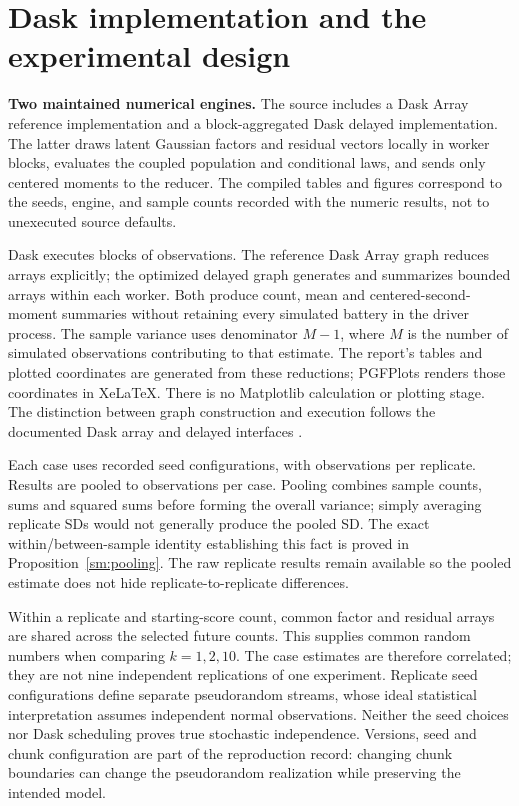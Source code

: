 \chapter{Dask implementation and the experimental design}
\label{sec:seq-sim-design}


\noindent\textbf{Two maintained numerical engines.}
The source includes a Dask Array reference implementation and a
block-aggregated Dask delayed implementation. The latter draws latent
Gaussian factors and residual vectors locally in worker blocks,
evaluates the coupled population and conditional laws, and sends only
centered moments to the reducer. The compiled tables and figures
correspond to the seeds, engine, and sample counts recorded with the
numeric results, not to unexecuted source defaults.

Dask executes blocks of \SimChunk{} observations. The reference
Dask Array graph reduces arrays explicitly; the optimized delayed
graph generates and summarizes bounded arrays within each worker.
Both produce count, mean and centered-second-moment summaries without
retaining every simulated battery in the driver process. The sample variance uses denominator \(M-1\), where \(M\)
is the number of simulated observations contributing to that estimate.
The report's tables and plotted coordinates are generated from these
reductions; PGFPlots renders those coordinates in XeLaTeX. There is no
Matplotlib calculation or plotting stage. The distinction between graph
construction and execution follows the documented Dask array and delayed
interfaces \citep{daskArray,daskDelayed}.

Each case uses \SimReplicates{} recorded seed configurations, with
\SimTrials{} observations per replicate. Results are pooled to
\SimPooledTrials{} observations per case. Pooling combines sample counts,
sums and squared sums before forming the overall variance; simply
averaging replicate SDs would not generally produce the pooled SD.
The exact within/between-sample identity establishing this fact is proved
in Proposition~\ref{sm:pooling}.
The raw replicate results remain available so the pooled estimate does
not hide replicate-to-replicate differences.

Within a replicate and starting-score count, common factor and residual
arrays are shared across the selected future counts. This supplies common
random numbers when comparing \(k=1,2,10\). The case estimates are
therefore correlated; they are not nine independent replications of one
experiment. Replicate seed configurations define separate pseudorandom
streams, whose ideal statistical interpretation assumes independent
normal observations. Neither the seed choices nor Dask scheduling proves
true stochastic independence. Versions, seed and chunk configuration are
part of the reproduction record: changing chunk boundaries can change
the pseudorandom realization while preserving the intended model.

